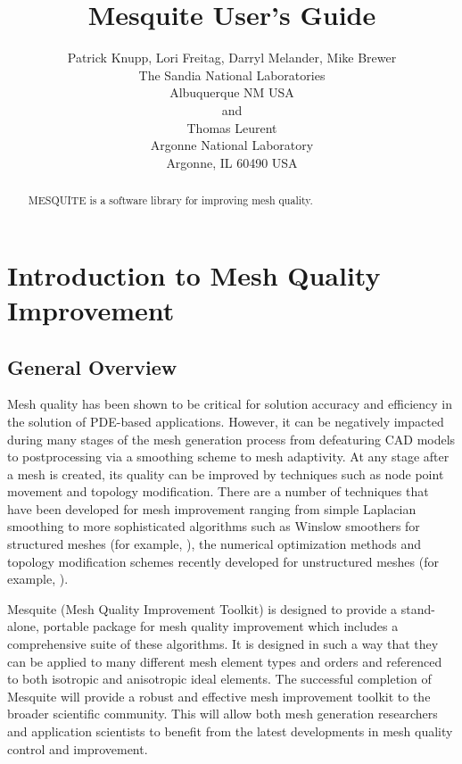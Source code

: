 \documentclass[psfig]{article}
\title{ {\LARGE\bf Mesquite User's Guide}}
\author{Patrick Knupp, Lori Freitag, Darryl Melander, Mike Brewer \\
The Sandia National Laboratories \\
Albuquerque NM USA \\
and \\
Thomas Leurent \\
Argonne National Laboratory \\
Argonne, IL 60490 USA}
\date{}
\begin{document}
\maketitle
\begin{abstract} 
MESQUITE is a software library for improving mesh quality. 
\end{abstract}

\tableofcontents

\listoffigures

\listoftables

\section{Introduction to Mesh Quality Improvement} 

\subsection{General Overview}

Mesh quality has been shown to be critical for solution accuracy and
efficiency in the solution of PDE-based applications.  However, it can
be negatively impacted during many stages of the mesh generation
process from defeaturing CAD models to postprocessing via a smoothing
scheme to mesh adaptivity. At any stage after a mesh is created, its
quality can be improved by techniques such as node point movement and
topology modification.  There are a number of techniques that have
been developed for mesh improvement ranging from simple Laplacian smoothing
\cite{F88} to more sophisticated algorithms such as Winslow smoothers
for structured meshes (for example, \cite{winslow}), the numerical
optimization methods and topology modification schemes recently
developed for unstructured meshes (for example, \cite{Opt-MS,Kn00,FrKn01,
FeasNewt,bjoe:swap,bjoe:chain-swap,es92}).

Mesquite (Mesh Quality Improvement Toolkit) is designed to provide a
stand-alone, portable package for mesh quality improvement which
includes a comprehensive suite of these algorithms.  It is designed in
such a way that they can be applied to many different mesh element
types and orders and referenced to both isotropic and anisotropic
ideal elements.  The successful completion of Mesquite will provide a
robust and effective mesh improvement toolkit to the broader
scientific community.  This will allow both mesh generation
researchers and application scientists to benefit from the latest
developments in mesh quality control and improvement.
\end{document}
